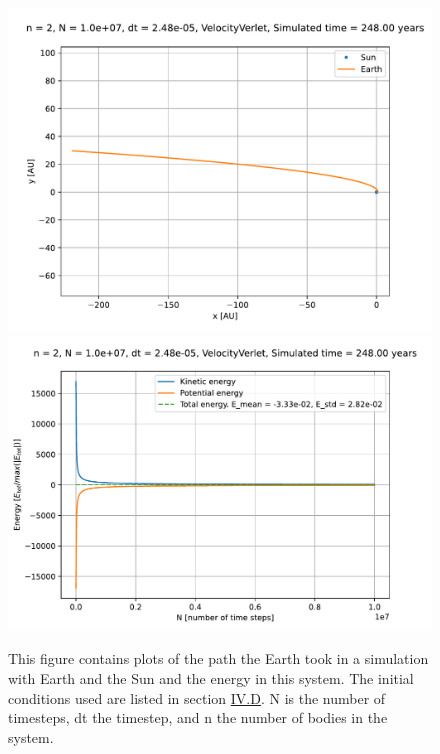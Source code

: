 \documentclass[reprint,english,notitlepage]{revtex4-1}  %
\begin{document}
\begin{figure}[H]
\includegraphics[scale=0.5]{../data/figures/escapevelocity/se_esc_exact_orbit2D.pdf}
\includegraphics[scale=0.5]{../data/figures/escapevelocity/se_esc_exact_energy.pdf}
\caption{This figure contains plots of the path the Earth took in a simulation with Earth and the Sun and the energy in this system. The initial conditions used are listed in section \hyperref[sec:IV:d]{IV.D}. N is the number of timesteps, dt the timestep, and n the number of bodies in the system.}
\label{fig:escvel_exact}
\end{figure}
\end{document}
